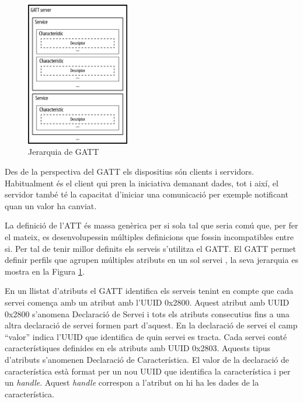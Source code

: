 \begin{figure}[h!]
	\begin{center}
		\includegraphics[width=0.4\textwidth]{./images/GATT_Hierarchy.png}
		\caption{Jerarquia de GATT \cite{GATT_Hierarchy}}
		\label{fig:Gatt_Hierarchy}
	\end{center}
\end{figure}

Des de la perspectiva del GATT els dispositius són clients i servidors.
Habitualment és el client qui pren la iniciativa demanant dades, tot i així, el servidor també té la capacitat d'iniciar una comunicació per exemple notificant quan un valor ha canviat.

La definició de l'ATT és massa genèrica per si sola tal que seria comú que, per fer el mateix, es desenvolupessin múltiples definicions que fossin incompatibles entre si.
Per tal de tenir millor definits els serveis s'utilitza el GATT.
El GATT permet definir perfils que agrupen múltiples atributs en un sol servei \cite{services}, la seva jerarquia es mostra en la Figura \ref{fig:Gatt_Hierarchy}.

En un llistat d'atributs el GATT identifica els serveis tenint en compte que cada servei comença amb un atribut amb l'UUID 0x2800.
Aquest atribut amb UUID 0x2800 s'anomena Declaració de Servei i tots els atributs consecutius fins a una altra declaració de servei formen part d'aquest.
En la declaració de servei el camp ``valor'' indica l'UUID que identifica de quin servei es tracta.
Cada servei conté característiques \cite{characteristics} definides en els atributs amb UUID 0x2803.
Aquests tipus d'atributs s'anomenen Declaració de Característica.
El valor de la declaració de característica està format per un nou UUID que identifica la característica i per un \textit{handle}.
Aquest \textit{handle} correspon a l'atribut on hi ha les dades de la característica.

